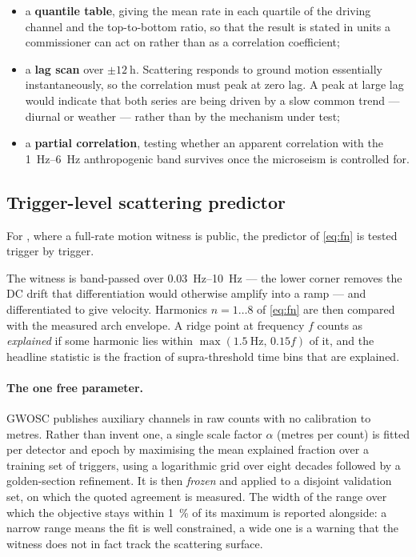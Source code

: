 \begin{itemize}
  \item a \textbf{quantile table}, giving the mean rate in each quartile of
        the driving channel and the top-to-bottom ratio, so that the result is
        stated in units a commissioner can act on rather than as a correlation
        coefficient;
  \item a \textbf{lag scan} over $\pm\SI{12}{\hour}$. Scattering responds to
        ground motion essentially instantaneously, so the correlation must
        peak at zero lag. A peak at large lag would indicate that both series
        are being driven by a slow common trend --- diurnal or weather ---
        rather than by the mechanism under test;
  \item a \textbf{partial correlation}, testing whether an apparent
        correlation with the \SIrange{1}{6}{\hertz} anthropogenic band
        survives once the microseism is controlled for.
\end{itemize}

\subsection{Trigger-level scattering predictor}
\label{sec:methods:predictor}

For \Lone, where a full-rate motion witness is public, the predictor of
\cref{eq:fn} is tested trigger by trigger.

The witness is band-passed over \SIrange{0.03}{10}{\hertz} --- the lower
corner removes the DC drift that differentiation would otherwise amplify into
a ramp --- and differentiated to give velocity. Harmonics $n = 1 \ldots 8$ of
\cref{eq:fn} are then compared with the measured arch envelope. A ridge point
at frequency $f$ counts as \emph{explained} if some harmonic lies within
$\max(\SI{1.5}{\hertz},\, 0.15 f)$ of it, and the headline statistic is the
fraction of supra-threshold time bins that are explained.

\paragraph{The one free parameter.} GWOSC publishes auxiliary channels in raw
counts with no calibration to metres. Rather than invent one, a single scale
factor $\alpha$ (metres per count) is fitted per detector and epoch by
maximising the mean explained fraction over a training set of triggers, using
a logarithmic grid over eight decades followed by a golden-section refinement.
It is then \emph{frozen} and applied to a disjoint validation set, on which the
quoted agreement is measured. The width of the range over which the objective
stays within \SI{1}{\percent} of its maximum is reported alongside: a narrow
range means the fit is well constrained, a wide one is a warning that the
witness does not in fact track the scattering surface.

